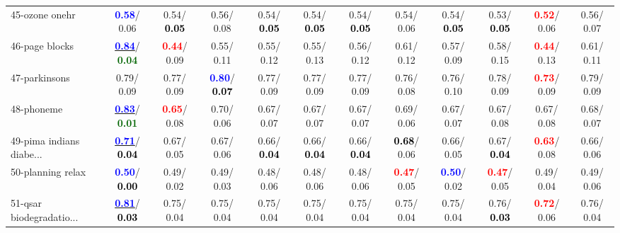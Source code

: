 \begin{table}[h]
\begin{center}
{\begin{tabular}{lc|c|c|c|c|c|c|c|c|c|c}
45-ozone onehr & \textcolor{blue}{\textbf{  0.58}}/  0.06 &   0.54/\textcolor{black}{\textbf{  0.05}} &   0.56/  0.08 &   0.54/\textcolor{black}{\textbf{  0.05}} &   0.54/\textcolor{black}{\textbf{  0.05}} &   0.54/\textcolor{black}{\textbf{  0.05}} &   0.54/  0.06 &   0.54/\textcolor{black}{\textbf{  0.05}} &   0.53/\textcolor{black}{\textbf{  0.05}} & \textcolor{red}{\textbf{  0.52}}/  0.06 &   0.56/  0.07 \\
46-page blocks & \underline{\textcolor{blue}{\textbf{  0.84}}}/\textcolor{darkgreen}{\textbf{  0.04}} & \textcolor{red}{\textbf{  0.44}}/  0.09 &   0.55/  0.11 &   0.55/  0.12 &   0.55/  0.13 &   0.56/  0.12 &   0.61/  0.12 &   0.57/  0.09 &   0.58/  0.15 & \textcolor{red}{\textbf{  0.44}}/  0.13 &   0.61/  0.11 \\ \hline
47-parkinsons &   0.79/  0.09 &   0.77/  0.09 & \textcolor{blue}{\textbf{  0.80}}/\textcolor{black}{\textbf{  0.07}} &   0.77/  0.09 &   0.77/  0.09 &   0.77/  0.09 &   0.76/  0.08 &   0.76/  0.10 &   0.78/  0.09 & \textcolor{red}{\textbf{  0.73}}/  0.09 &   0.79/  0.09 \\
48-phoneme & \underline{\textcolor{blue}{\textbf{  0.83}}}/\textcolor{darkgreen}{\textbf{  0.01}} & \textcolor{red}{\textbf{  0.65}}/  0.08 &   0.70/  0.06 &   0.67/  0.07 &   0.67/  0.07 &   0.67/  0.07 &   0.69/  0.06 &   0.67/  0.07 &   0.67/  0.08 &   0.67/  0.08 &   0.68/  0.07 \\
49-pima indians diabe... & \underline{\textcolor{blue}{\textbf{  0.71}}}/\textcolor{black}{\textbf{  0.04}} &   0.67/  0.05 &   0.67/  0.06 &   0.66/\textcolor{black}{\textbf{  0.04}} &   0.66/\textcolor{black}{\textbf{  0.04}} &   0.66/\textcolor{black}{\textbf{  0.04}} & \textcolor{black}{\textbf{  0.68}}/  0.06 &   0.66/  0.05 &   0.67/\textcolor{black}{\textbf{  0.04}} & \textcolor{red}{\textbf{  0.63}}/  0.08 &   0.66/  0.06 \\
50-planning relax & \textcolor{blue}{\textbf{  0.50}}/\textcolor{black}{\textbf{  0.00}} &   0.49/  0.02 &   0.49/  0.03 &   0.48/  0.06 &   0.48/  0.06 &   0.48/  0.06 & \textcolor{red}{\textbf{  0.47}}/  0.05 & \textcolor{blue}{\textbf{  0.50}}/  0.02 & \textcolor{red}{\textbf{  0.47}}/  0.05 &   0.49/  0.04 &   0.49/  0.06 \\
51-qsar biodegradatio... & \underline{\textcolor{blue}{\textbf{  0.81}}}/\textcolor{black}{\textbf{  0.03}} &   0.75/  0.04 &   0.75/  0.04 &   0.75/  0.04 &   0.75/  0.04 &   0.75/  0.04 &   0.75/  0.04 &   0.75/  0.04 &   0.76/\textcolor{black}{\textbf{  0.03}} & \textcolor{red}{\textbf{  0.72}}/  0.06 &   0.76/  0.04 \\

\end{tabular}}
\end{center}
\end{table}
